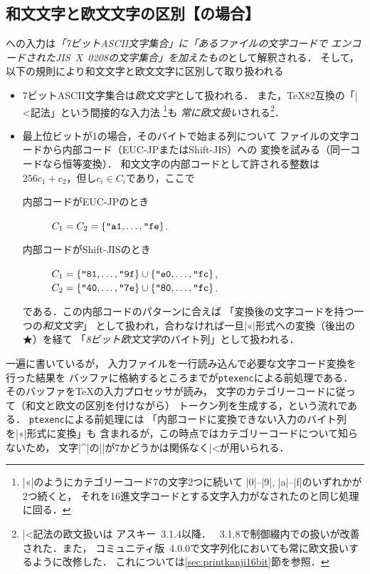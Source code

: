 \documentclass[a4paper,11pt,nomag,dvipdfmx]{jsarticle}
\def\code#1{\texttt{#1}}
\begin{document}
\subsection{和文文字と欧文文字の区別【\pTeX の場合】}
\pTeX への入力は\emph{「7ビットASCII文字集合」に「あるファイルの文字コードで
エンコードされたJIS~X~0208の文字集合」を加えたもの}として解釈される．
そして，以下の規則により和文文字と欧文文字に区別して取り扱われる
\begin{itemize}
 \item 7ビットASCII文字集合は\emph{欧文文字}として扱われる．
    また，\TeX82互換の「|^^|記法」という間接的な入力法
    \footnote{|^^ab|のようにカテゴリーコード7の文字2つに続いて
    |0|--|9|, |a|--|f|のいずれかが2つ続くと，
    それを16進文字コードとする文字入力がなされたのと同じ処理に回る．}も
    \emph{常に欧文扱い}される\footnote{|^^|記法の欧文扱いは
    アスキー\pTeX~3.1.4以降．
    \pTeX~3.1.8で制御綴内での扱いが改善された．また，
    コミュニティ版\pTeX~4.0.0で文字列化においても常に欧文扱いするように改修した．
    これについては\ref{sec:printkanji16bit}節を参照．}．
 \item 最上位ビットが1の場合，そのバイトで始まる列について
    ファイルの文字コードから内部コード（EUC-JPまたはShift-JIS）への
    変換を試みる（同一コードなら恒等変換）．
    和文文字の内部コードとして許される整数は
    $256c_1+c_2$，但し$c_i\in C_i$であり，ここで
  \begin{description}
   \item[内部コードがEUC-JPのとき]
    $C_1=C_2=\{\hex{a1},\dots,\hex{fe}\}$.
   \item[内部コードがShift-JISのとき]
    $C_1=\{\hex{81},\dots,\hex{9f}\}\cup\{\hex{e0},\dots,\hex{fc}\}$,\\
    $C_2=\{\hex{40},\dots,\hex{7e}\}\cup\{\hex{80},\dots,\hex{fc}\}$.
  \end{description}
    である．この内部コードのパターンに合えば
    「変換後の文字コードを持つ一つの\emph{和文文字}」
    として扱われ，合わなければ一旦|^^ab|形式への変換（後出の★）を経て
    「\emph{8ビット欧文文字}のバイト列」として扱われる．
\end{itemize}

\begin{dangerous}
一遍に書いているが，
入力ファイルを一行読み込んで必要な文字コード変換を行った結果を
バッファに格納するところまでが\code{ptexenc}による前処理である．
そのバッファを\TeX の入力プロセッサが読み，
文字のカテゴリーコードに従って（和文と欧文の区別を付けながら）
トークン列を生成する，という流れである．
\code{ptexenc}による前処理には
「内部コードに変換できない入力のバイト列を|^^ab|形式に変換」も
含まれるが，この時点ではカテゴリーコードについて知らないため，
文字|^|の|\catcode|が7かどうかは関係なく|^^|が用いられる．
\end{dangerous}
\end{document}
